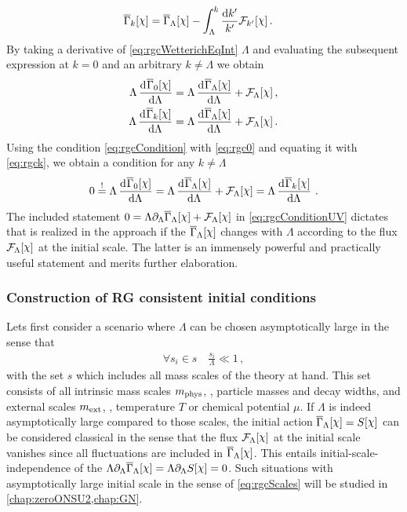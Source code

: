 \begin{align}
	\FSeaa_k[\FSsf]&= \FSeaa_\Lambda[\FSsf] -\int_\Lambda^k \frac{\dif k'}{k'} \FRGflow_{k'}[\FSsf]\,.
	\label{eq:rgcWetterichEqInt}
\end{align}
By taking a derivative of \cref{eq:rgcWetterichEqInt} \wrt{} $\Lambda$ and evaluating the subsequent expression at ${k=0}$ and an arbitrary ${k\neq\Lambda}$ we obtain
\begin{subequations}\label{eq:rgc}
\begin{align}
	\Lambda\dod{\FSeaa_0[\FSsf]}{\Lambda}&=\Lambda\dod{\FSeaa_\Lambda[\FSsf]}{\Lambda}+\FRGflow_{\Lambda}[\FSsf]\label{eq:rgc0}\,,\\
	\Lambda\dod{\FSeaa_k[\FSsf]}{\Lambda}&=\Lambda\dod{\FSeaa_\Lambda[\FSsf]}{\Lambda}+\FRGflow_{\Lambda}[\FSsf]\label{eq:rgck}\,.
\end{align}
\end{subequations}
Using the \rgcy{} condition \eqref{eq:rgcCondition} with \cref{eq:rgc0} and equating it with \cref{eq:rgck}, we obtain a \rgcy{} condition for any $k\neq \Lambda$
\begin{align}
	0\overset{!}{=} \Lambda\dod{\FSeaa_0[\FSsf]}{\Lambda} =\Lambda\dod{\FSeaa_\Lambda[\FSsf]}{\Lambda}+\FRGflow_{\Lambda}[\FSsf]= \Lambda\dod{\FSeaa_k[\FSsf]}{\Lambda}\, .
	\label{eq:rgcConditionUV}
\end{align}
The included statement $0=\Lambda\partial_\Lambda\FSeaa_\Lambda[\FSsf]+\FRGflow_{\Lambda}[\FSsf]$ in \cref{eq:rgcConditionUV} dictates that \rgcy{} is realized in the \frg{} approach if the \ic{}
$\FSeaa_\Lambda[\FSsf]$ changes with $\Lambda$ according to the \frg{} flux $\FRGflow_{\Lambda}[\FSsf]$ at the initial scale.
The latter is an immensely powerful and practically useful statement and merits further elaboration.

\subsubsection{Construction of RG consistent initial conditions}\label{subsubsec:rgcICS}
Lets first consider a scenario where $\Lambda$ can be chosen asymptotically large in the sense that
\begin{align}
	\forall s_i\in s \quad \frac{s_i}{\Lambda}\ll 1\, ,\label{eq:rgcScales}
\end{align}
with the set $s$ which includes all mass scales of the theory at hand.
This set consists of all intrinsic mass scales $m_{\mathrm{phys}}$, \eg{}, particle masses and decay widths, and external scales $m_{\mathrm{ext}}$, \eg{}, temperature $T$ or chemical potential $\mu$.
If $\Lambda$ is indeed asymptotically large compared to those scales, the initial action $\FSeaa_\Lambda[\FSsf]=S[\FSsf]$ can be considered classical in the sense that the \frg{} flux $\FRGflow_{\Lambda}[\FSsf]$ at the initial scale vanishes since all fluctuations are included in $\FSeaa_\Lambda[\FSsf]$.
This entails initial-scale-independence of the \ic{} $\Lambda\partial_\Lambda\FSeaa_\Lambda[\FSsf]=\Lambda\partial_\Lambda S[\FSsf]=0$.
Such situations with asymptotically large initial scale in the sense of \cref{eq:rgcScales} will be studied in \cref{chap:zeroONSU2,chap:GN}.\bigskip

